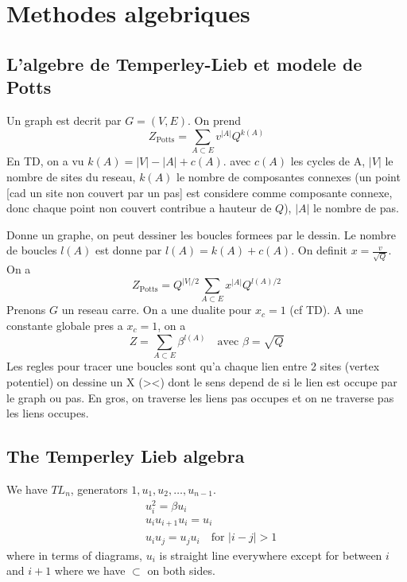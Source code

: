 \documentclass[a4paper]{book}
\theoremstyle{definition}
\theoremstyle{remark}
\begin{document}
\chapter{Methodes algebriques}

\section{L'algebre de Temperley-Lieb et modele de Potts}
Un graph est decrit par $G = (V, E)$. On prend
\begin{equation}
    Z_\text{Potts} = \sum_{A \subset E} v^{|A|}Q^{k(A)}
\end{equation}
En TD, on a vu $k(A) = |V| - |A| + c(A)$. avec $c(A)$ les cycles de A, $|V|$ le nombre de sites du reseau, $k(A)$ le nombre de composantes connexes (un point [cad un site non couvert par un pas] est considere comme composante connexe, donc chaque point non couvert contribue a hauteur de $Q$), $|A|$ le nombre de pas. \par \medskip 

Donne un graphe, on peut dessiner les boucles formees par le dessin. Le nombre de boucles $l(A)$ est donne par $l(A) = k(A) + c(A)$. On definit $x = \frac{v}{\sqrt{Q}}$. On a 
\begin{equation}
    Z_{\text{Potts}} = Q^{|V|/2}\sum_{A\subset E} x^{|A|} Q^{l(A)/2}
\end{equation}
Prenons $G$ un reseau carre. On a une dualite pour $x_c = 1$ (cf TD). A une constante globale pres a $x_c = 1$, on a 
\begin{equation}
    Z = \sum_{A\subset E} \beta^{l(A)} \quad \text{avec  } \beta = \sqrt{Q}
\end{equation}
Les regles pour tracer une boucles sont qu'a chaque lien entre 2 sites (vertex potentiel) on dessine un X (><) dont le sens depend de si le lien est occupe par le graph ou pas. En gros, on traverse les liens pas occupes et on ne traverse pas les liens occupes. 

\section{The Temperley Lieb algebra}

We have $TL_n$, generators $1, u_1, u_2, \dots, u_{n-1}$. 
\begin{equation}
    \begin{aligned}
        &u_i ^2 = \beta u_i \\
        &u_i u_{i+1} u_i = u_i \\ 
        &u_i u_j = u_j u_i \quad \text{for } |i-j| > 1
    \end{aligned}
\label{eq:laws}\end{equation}
where in terms of diagrams, $u_i$ is straight line everywhere except for between $i$ and $i+1$ where we have $\subset$ on both sides. \par \medskip 
\end{document}
